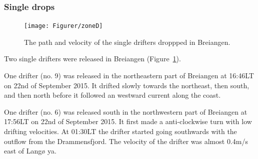 \documentclass[12pt,a4paper,english]{article}
\begin{document}
\subsubsection{Single drops}
%
\begin{figure}[ht]
\centerline{
\texttt{[image: Figurer/zoneD]}}
\caption{\small
The path and velocity of the single drifters droppped in Breiangen.}
\label{fig:ZoneD}
\end{figure}
%
%
Two single drifters were released in Breiangen (Figure~\ref{fig:ZoneD}).

One drifter (no. 9) was released in the northeastern part of Breiangen at 16:46LT on 22nd of September 2015. It drifted slowly towards the northeast, then south, and then north before it followed an westward current along the coast. %

One drifter (no. 6) was released south in the northwestern part of Breiangen at 17:56LT on 22nd of September 2015. It first made a anti-clockwise turn with low drifting velocities. %
At 01:30LT the drifter started going southwards with the outflow from the Drammensfjord. The velocity of the drifter was almost 0.4m/s east of Lang{\o} ya. %


%
%
%
\end{document}

